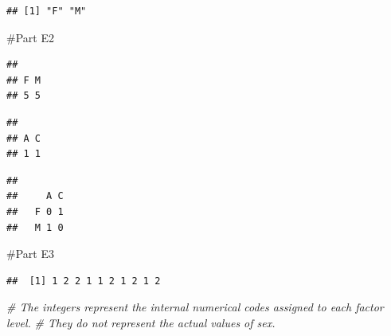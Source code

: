 \documentclass[
]{article}
\newenvironment{Shaded}{\begin{snugshade}}{\end{snugshade}}
\newcommand{\CommentTok}[1]{\textcolor[rgb]{0.56,0.35,0.01}{\textit{#1}}}
\newcommand{\FunctionTok}[1]{\textcolor[rgb]{0.13,0.29,0.53}{\textbf{#1}}}
\newcommand{\NormalTok}[1]{#1}
\newcommand{\SpecialCharTok}[1]{\textcolor[rgb]{0.81,0.36,0.00}{\textbf{#1}}}
\begin{document}
\begin{verbatim}
## [1] "F" "M"
\end{verbatim}

\#Part E2

\begin{Shaded}
\end{Shaded}

\begin{verbatim}
## 
## F M 
## 5 5
\end{verbatim}

\begin{Shaded}
\end{Shaded}

\begin{verbatim}
## 
## A C 
## 1 1
\end{verbatim}

\begin{Shaded}
\end{Shaded}

\begin{verbatim}
##    
##     A C
##   F 0 1
##   M 1 0
\end{verbatim}

\#Part E3

\begin{Shaded}
\end{Shaded}

\begin{verbatim}
##  [1] 1 2 2 1 1 2 1 2 1 2
\end{verbatim}

\begin{Shaded}
\begin{Highlighting}[]
\CommentTok{\# The integers represent the internal numerical codes assigned to each factor level.}
\CommentTok{\# They do not represent the actual values of sex.}
\end{Highlighting}
\end{Shaded}
\end{document}
